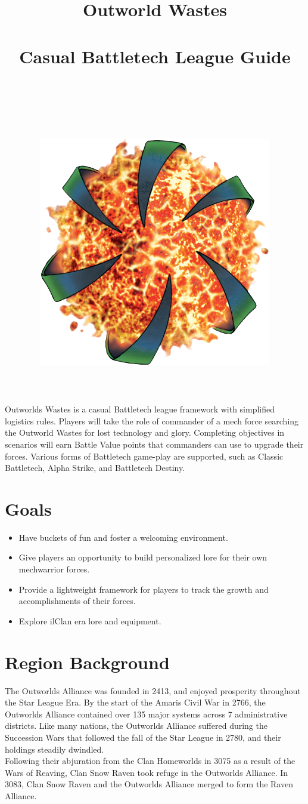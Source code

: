\documentclass[UTF8]{article}
\title{
  Outworld Wastes\\
  ~\\
  \large Casual Battletech League Guide \\
  ~\\
  ~\\
  ~\\
  \includegraphics[width=4in]{img/Outworlds_Alliance.png}
}
\author{}
\date{}
\begin{document}
\maketitle

\newpage

Outworlds Wastes is a casual Battletech league framework with simplified logistics rules.
Players will take the role of commander of a mech force searching the Outworld Wastes for lost technology and glory.
Completing objectives in scenarios will earn Battle Value points that commanders can use to upgrade their forces.
Various forms of Battletech game-play are supported, such as Classic Battletech, Alpha Strike, and Battletech Destiny.

\section*{Goals}

\begin{itemize}

\item Have buckets of fun and foster a welcoming environment.

\item Give players an opportunity to build personalized lore for their own mechwarrior forces.

\item Provide a lightweight framework for players to track the growth and accomplishments of their forces.

\item Explore ilClan era lore and equipment.

\end{itemize}

\newpage

\section{Region Background}

The Outworlds Alliance was founded in 2413, and enjoyed prosperity throughout the Star League Era.
By the start of the Amaris Civil War in 2766, the Outworlds Alliance contained over 135 major systems across 7 administrative districts.
Like many nations, the Outworlds Alliance suffered during the Succession Wars that followed the fall of the Star League in 2780, and their holdings steadily dwindled.\\

Following their abjuration from the Clan Homeworlds in 3075 as a result of the Wars of Reaving, Clan Snow Raven took refuge in the Outworlds Alliance.
In 3083, Clan Snow Raven and the Outworlds Alliance merged to form the Raven Alliance.\\
\end{document}
